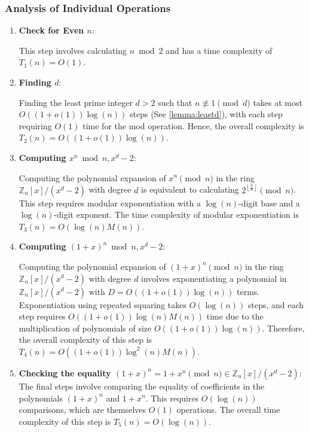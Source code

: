 \documentclass{article}
\theoremstyle{plain}
\theoremstyle{definition}
\newcommand{\floor}[1]{\left\lfloor #1 \right\rfloor}
\newcommand{\Z}{\mathbb{Z}}
\newcommand{\Mx}{\Z_n[x]/(x^d-2)}
\begin{document}
\subsubsection{Analysis of Individual Operations}
\begin{enumerate}
    \item \textbf{Check for Even \( n \)}:
    
        This step involves calculating $n \bmod{2}$ and has a time complexity of \( T_1(n) = O(1) \).

    \item \textbf{Finding \( d \)}:
    
        Finding the least prime integer \( d > 2 \) such that $n \not\equiv 1 \pmod{d}$ takes at most \( O((1 + o(1))\log(n)) \) steps (See \cref{lemma:leastd}), with each step requiring \( O(1) \) time for the mod operation. Hence, the overall complexity is \(  T_2(n) = O((1 + o(1))\log(n)) \).

    \item \textbf{Computing \( x^n \bmod{n, x^d-2} \)}:
    
        Computing the polynomial expansion of $x^n \pmod{n}$ in the ring \( \Mx \) with degree $d$ is equivalent to calculating $2^{\floor{\frac{n}{d}}} \pmod{n}$. This step requires modular exponentiation with a \( \log(n) \)-digit base and a \( \log(n) \)-digit exponent. The time complexity of modular exponentiation is \(  T_3(n) = O(\log(n) M(n)) \).

    \item \textbf{Computing \( (1+x)^n \bmod{n, x^d-2} \)}:
    
        Computing the polynomial expansion of \( (1+x)^n \pmod{n} \) in the ring \( \Z_n[x]/(x^d-2) \)  with degree $d$ involves exponentiating a polynomial in $\Z_n[x]/(x^d-2)$ with \( D = O((1 + o(1))\log(n)) \) terms. Exponentiation using repeated squaring takes \( O(\log(n)) \) steps, and each step requires \( O((1 + o(1)) \log(n) M(n)) \) time due to the multiplication of polynomials of size \( O((1 + o(1)) \log(n)) \). Therefore, the overall complexity of this step is \(  T_4(n) =O((1 + o(1)) \log^2(n) M(n)) \).
         
    \item \textbf{Checking the equality \( (1+x)^n = 1 + x^n \pmod{n} \in \Z_n[x]/(x^d-2) \)}:
        The final steps involve comparing the equality of coefficients in the polynomials $(1+x)^n$ and $1 + x^n$. This requires $O(\log(n))$ comparisons, which are themselves \( O(1) \) operations. The overall time complexity of this step is $T_5(n) = O(\log(n))$.
\end{enumerate}
\end{document}
